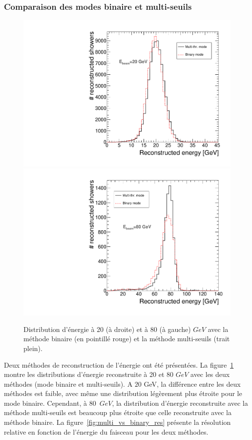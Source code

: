 \subsubsection{Comparaison des modes binaire et multi-seuils}
\begin{figure}[!ht]
  \begin{center}
    \includegraphics[width=.45\textwidth]{SDHCAL/figs/Pi20GeV_SDHCAL_2modes_overlay.pdf}
    \includegraphics[width=.45\textwidth]{SDHCAL/figs/Pi80GeV_SDHCAL_2modes_overlay.pdf}
    \caption{Distribution d'énergie à 20 (à droite) et à 80 (à gauche) $GeV$ avec la méthode binaire (en pointillé rouge) et la méthode multi-seuils (trait plein).}
    \label{fig:multi_vs_binary_dist}
  \end{center}
\end{figure}
Deux méthodes de reconstruction de l'énergie ont été présentées. La figure~\ref{fig:multi_vs_binary_dist} montre les distributions d'énergie reconstruite à 20 et 80 $GeV$ avec les deux méthodes (mode binaire et multi-seuils). A $20$ GeV, la différence entre les deux méthodes est faible, avec même une distribution légèrement plus étroite pour le mode binaire. Cependant, à 80~$GeV$, la distribution d'énergie reconstruite avec la méthode multi-seuils est beaucoup plus étroite que celle reconstruite avec la méthode binaire. La figure~\ref{fig:multi_vs_binary_res} présente la résolution relative en fonction de l'énergie du faisceau pour les deux méthodes.

